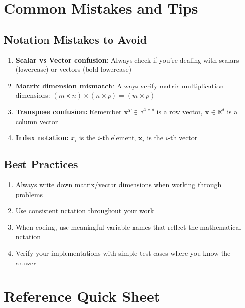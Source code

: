 \documentclass{article}
\providecommand{\vx}{\mathbf{x}}
\providecommand{\Real}{\mathbb{R}}
\newcounter{coding}
\begin{document}
\section{Common Mistakes and Tips}

\subsection{Notation Mistakes to Avoid}
\begin{enumerate}
    \item \textbf{Scalar vs Vector confusion:} Always check if you're dealing with scalars (lowercase) or vectors (bold lowercase)
    \item \textbf{Matrix dimension mismatch:} Always verify matrix multiplication dimensions: $(m \times n) \times (n \times p) = (m \times p)$
    \item \textbf{Transpose confusion:} Remember $\vx^T \in \Real^{1 \times d}$ is a row vector, $\vx \in \Real^d$ is a column vector
    \item \textbf{Index notation:} $x_i$ is the $i$-th element, $\vx_i$ is the $i$-th vector
\end{enumerate}

\subsection{Best Practices}
\begin{enumerate}
    \item Always write down matrix/vector dimensions when working through problems
    \item Use consistent notation throughout your work
    \item When coding, use meaningful variable names that reflect the mathematical notation
    \item Verify your implementations with simple test cases where you know the answer
\end{enumerate}

\section{Reference Quick Sheet}
\end{document}
